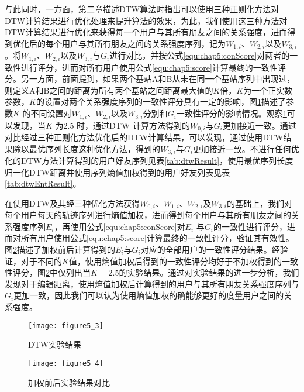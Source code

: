 与此同时，一方面，第二章描述DTW算法时指出可以使用三种正则化方法对DTW计算结果进行优化处理来提升算法的效果，为此，我们使用这三种方法对DTW计算结果进行优化来获得每一个用户与其所有朋友之间的关系强度，进而得到优化后的每个用户与其所有朋友之间的关系强度序列，记为$W_{1,i}$、$W_{2,i}$以及$W_{3,i}$。将$W_{1,i}$、$W_{2,i}$以及$W_{3,i}$与$G_{i}$进行对比，并按公式\ref{equ:chap5:conScore}对两者的一致性进行评分，进而对所有用户使用公式\ref{equ:chap5:score}计算最终的一致性评分。另一方面，前面提到，如果两个基站A和B从未在同一个基站序列中出现过，则定义A和B之间的距离为所有两个基站之间距离最大值的$K$倍，$K$为一个正实数参数，$K$的设置对两个关系强度序列的一致性评分具有一定的影响，图\ref{fig:5_3}描述了参数$K$ 的不同设置对$W_{1,i}$、$W_{2,i}$以及$W_{3,i}$分别和$G_{i}$一致性评分的影响情况。观察\ref{fig:5_3}可以发现，当$K$ 为2.5 时，通过DTW 计算方法得到的$W_{0,i}$与$G_{i}$更加接近一致。通过对比经过三种正则化方法优化后的DTW计算结果，可以发现，通过使用DTW结果除以最优序列长度这种优化方法，得到的$W_{3,i}$与$G_{i}$更加接近一致。不进行任何优化的DTW方法计算得到的用户好友序列见表\ref{tab:dtwResult}，使用最优序列长度归一化DTW距离并使用序列熵值加权得到的用户好友列表见表\ref{tab:dtwEntResult}。
\par 在使用DTW及其经三种优化方法获得$W_{0,i}$、$W_{1,i}$、$W_{2,i}$及$W_{3,i}$的基础上，我们对每个用户每天的轨迹序列进行熵值加权，进而得到每个用户与其所有朋友之间的关系强度序列$E_{i}$，再使用公式\ref{equ:chap5:conScore}对$E_{i}$ 与$G_{i}$的一致性进行评分，进而对所有用户使用公式\ref{equ:chap5:score}计算最终的一致性评分，验证其有效性。图\ref{fig:5_4}描述了加权前后计算得到的$E_{i}$与$G_{i}$对应的全部用户的一致性评分结果。经验证，对于不同的$K$值，使用熵值加权后得到的一致性评分均好于不加权得到的一致性评分，图\ref{fig:5_4}中仅列出当$K=2.5$的实验结果。通过对实验结果的进一步分析，我们发现对于编辑距离，使用熵值加权后计算得到的用户与其所有朋友关系强度序列与$G_{i}$更加一致，因此我们可以认为使用熵值加权的确能够更好的度量用户之间的关系强度。
\begin{figure}[htp]
\centering
\texttt{[image: figure5\_3]}
\caption{DTW实验结果}
\label{fig:5_3}
\end{figure}
\begin{figure}[htp]
\centering
\texttt{[image: figure5\_4]}
\caption{加权前后实验结果对比}
\label{fig:5_4}
\end{figure}
